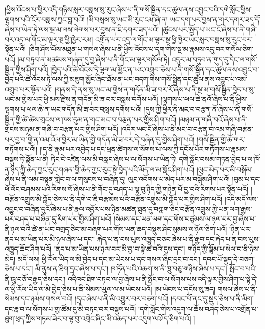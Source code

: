 །ཕྱིས་འོངས་པ་ཕྱིར་འདི་གཉིས་སླར་བསླས་སུ་རུང་ཞེས་པ་ནི་གསོ་སྦྱིན་དང་ཚུལ་ནས་འབྱུང་བའི་དགེ་སློང་ཕྱིས་ལྷགས་པའི་ངོར་བསླས་ཀྱང་བླ་བའོ། །མི་བསླས་སུ་ཡང་མི་རུང་ངམ་ཞེ་ན། ཡང་དག་པར་བྱས་ན་གར་དགར་ཟད་དོ་ཞེས་པ་ཡིན་ཏེ་ལས་སྔ་མ་ལས་ལེགས་པར་བྱས་ན་ཇི་དགར་ཟད་པའོ། །ཚུངས་པར་སྤྱོད་པ་ཡང་ངོ་ཞེས་པ་ནི་གཞི་བར་འདྲ་ལ་གོང་མ་ལྟར་སྔ་ཕྱི་ཁྱེར་རམ། འགྲོན་པར་འདྲ་ལ་གོང་མ་ལྟར་སྔ་ཕྱི་ཁྱེར་ཡང་སླར་བསླས་སུ་རུང་བར་སྟོན་པའོ། །ཅིག་ཤོས་པོས་མཐུན་པ་གསལ་ཞེས་པ་ནི་ཕྱིས་འོངས་པ་དག་གིས་སྔ་མ་རྣམས་འདུ་བར་གསོལ་ཅིག་པའོ། །མ་བཏུབ་ན་མཚམས་གཞན་དུ་བྱ་ཞེས་པ་ནི་གོང་མ་ལྟར་གསོལ་ཏེ། འདུར་མ་བཏུབ་ན་གུད་དུ་དེང་ལ་གསོ་སྦྱིན་གྱིས་ཤིག་པའོ། །བྱེད་པའི་ཚེ་འོངས་ཏེ་ལྷག་མ་མྱོང་ན་ཡང་འགྲུབ་ཅེས་པ་ནི་གསོ་སྦྱིན་དང་ཚུལ་ནས་འབྱུང་བ་བྱེད་པའི་ཚེ་འོངས་ཏེ་ལས་ཀྱི་མཇུག་མྱོང་ཞིང་ཐོས་ན་ཡང་བདག་གིས་གསོ་སྦྱིན་དང་ཚུལ་ནས་འབྱུང་པ་འམ་འགྲུབ་པར་སྟོན་པའོ། །གནས་དེ་ནས་སུ་ཡང་མ་གྱེས་ན་གདོན་མི་ཟ་བར་རོ་ཞེས་པ་ནི་སྔ་མ་གསོ་སྦྱིན་བྱེད་པ་སུ་ཡང་མ་གྱེས་པར་ཕྱི་མས་རྫིས་ན་གདོན་མི་ཟ་བར་བསླས་དགོས་པའོ། །ལྷགས་པ་ཕལ་ཆེ་ནའོ་ཞེས་པ་ནི་ཕྱིས་ལྷགས་པ་ཕལ་ཆེ་ན་ཡང་གདོན་མི་ཟ་བར་བསླས་དགོས་པའོ། །དུས་ཀྱི་ཕྱིར་ནི་མང་བ་བརྩན་ནོ་ཞེས་པ་ནི་གསོ་སྦྱིན་གྱི་ཚེ་ཚེས་གྲངས་ལ་ཁས་དུམ་ན་གང་མང་བ་བརྩན་པར་གྱིས་ཤིག་པའོ། །མཉམ་ན་གཞི་བའོ་ཞེས་པ་ནི་གྲངས་མཉམ་ན་གཞི་བ་བརྩན་པར་གྱིས་ཤིག་པའོ། །འདིར་ཡང་ངོ་ཞེས་པ་ནི་མང་བ་བརྩན་བ་འམ་གཞི་བརྩན་པར་བྱ་བ་གྱི་ན་འམ་འོལ་བྱིར་མ་ཡིན་གྱི་གདོན་མི་ཟ་བར་དེ་བཞིན་དུ་གྱིས་ཤིག་པའོ། །གསོ་སྦྱིན་གྱི་ཆོ་གར་གཏོགས་པའོ།། །།ད་ནི་རྣམ་པར་འབྱེད་པ་དང་ཕྲན་ཚེགས་ལ་སོགས་པ་ལས་ཀྱི་དངོས་པོར་གཏོགས་པ་རྣམས་བསྡུས་ཏེ་སྟོན་པ་ནི། ཏིང་ངེ་འཛིན་ལས་མི་བསླང་ཞེས་པ་ལ་སོགས་པ་ཡིན་ཏེ། དགེ་སློང་བསམ་གཏན་བྱེད་པ་ལ་ཁོ་ན་ཉིད་ཀྱི་ཆེད་ཀྱང་རུང་གཞན་གྱི་ཆེད་ཀྱང་རུང་སྟེ་བྱེད་པའི་མོད་ལ་མ་སློང་ཤིག་པའོ། །ལུང་མེད་པར་མི་བསྒོམ་ཞེས་པ་ནི་ལམ་བསྟན་གླེང་བ་ལ་གསུངས་པ་བཞིན་དུ། ལུང་འབོགས་པ་མེད་པར་མ་བསྒོམ་ཤིག་པའོ། །བུམ་པ་དང་ཕོ་ལོང་བཤམས་པའི་རིགས་སོ་ཞེས་པ་ནི་གོང་དུ་བཤད་པ་ལྟ་བུ་ཉིད་ཀྱི་གཉེན་པོ་བྱ་བའི་རིགས་པར་སྟོན་པའོ། །བརྩོན་འགྲུས་མི་ཀློད་ཅེས་པ་ནི་དགེ་བ་ཇི་བརྩམས་པའི་བརྩོན་འགྲུས་མི་ཀློད་པར་གྱིས་ཤིག་པའོ། །འདི་མདོ་ལས་འབྱུང་བ་བཞིན་དུའོ་ཞེས་པ་ནི་རྣལ་འབྱོར་པས་ཉིན་མཚན་ཐུན་དུ་བཀླག་ཅིང་བརྩོན་འགྲུས་ཀྱི་ཡན་ལག་རྒྱས་པར་བཤད་པ་བཞིན་དུ་རིག་པར་གྱིས་ཤིག་པའོ། །སེམས་དང་ཡན་ལག་དང་གོས་བཙུམས་ལ་ཉལ་བར་བྱ་ཞེས་པ་ནི་ཉལ་བའི་ཚེ་ན་ཡང་བགྲད་ཅིང་མ་བཞག་པར་གོས་ཡན་ཆད་བསྡུས་ཤིང་སུམས་ལ་ཉོལ་ཅིག་པའོ། །ཉིན་པར་ནད་པ་མ་ཡིན་པར་མི་ཉལ་ཞེས་པ་དང་། རྐེད་པ་ན་བས་པུས་འཁྱུད་བཅང་ཞེས་པ་ནི་རྒྱབ་དང་རྐེད་པ་ན་བས་པུས་འཁྱུད་ཆོང་ཤིག་པའོ། །ནད་པ་མ་ཡིན་པས་ཉལ་བར་མི་བྱ་བ་སྟེ་ཚ་བའི་དུས་དང་། གཉིད་ཀྱི་སྙོམ་པ་སེལ་བ་ནི་ཉེས་མེད། མདོ་ལས། ཕྱི་རོལ་ཡིད་ལ་མི་བྱེད་པ་དང་མ་ཡེངས་པ་དང་གསལ་ཞིང་དྲང་བ་དང་། དབང་པོ་སྡུད་དེ་བཅག་ཅེས་པ་དང་། མི་ནུས་ན་ཐིག་དྲང་ཞེས་པ་དང་། ཁ་ཏོན་པའི་འཆག་ས་ནི་ཁྲུ་བཅུ་གཉིས་ཞེས་པ་དང་། སྤོང་བ་པའི་ནི་ཁྲུ་བཅོ་བརྒྱད་ཅེས་དང་། འདིའང་ཐིག་བཏབ་ལ་བྱ་ཞེས་པ་ནི་སྤོང་བ་ལ་སོགས་པས་འདི་ལྟར་གྱིས་ཤིག་པ་སྟེ་དེ་ལ་ཕྱི་རོལ་ཡིད་ལ་མི་བྱེད་ཅེས་པ་ནི་སེམས་ཡུལ་ལ་མ་ཡེངས་པའོ། །མ་ཡེངས་པ་དངོས་སུ་ཟད། གསལ་ཞེས་པ་ནི་སེམས་དང་ཉམས་གསལ་བའོ། །དྲང་ཞེས་པ་ནི་མི་འགྱུར་བར་བཅག་པའོ། །དབང་པོ་ནང་དུ་སྡུད་ཅེས་པ་ནི་མིག་དང་རྣ་བ་ལ་སོགས་པ་གྱ་ཚོམ་དུ་མི་བཏང་བར་བསྡུས་པའོ། །དགེ་སློང་གིས་འདུག་ལ་ཆོས་བཤད་ཅེས་པ་འགྲོན་པ་ཐུག་ཕྲད་ཀྱིས་གཏམ་ཟེར་བ་ལྟ་བུ་འགྲེང་ཞིང་མི་འཆད་པར་འདུག་ལ་ཤོད་ཅིག་པའོ། །
